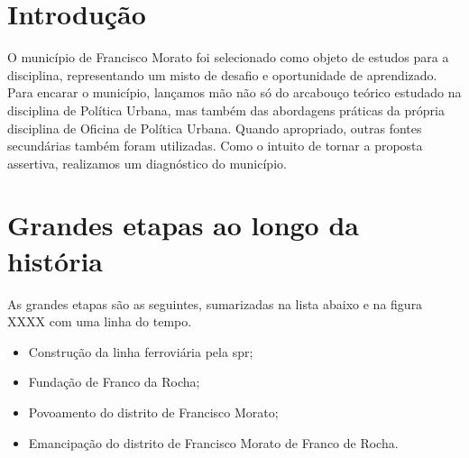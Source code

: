 	

	\tableofcontents 
	\newpage \listoffigures
	\newpage \listoftables
	\textual


%
%

%
%
	
	\chapter{Introdução}

	O município de Francisco Morato foi selecionado como objeto de estudos para a disciplina, representando um misto de desafio e oportunidade de aprendizado. Para encarar o município, lançamos mão não só do arcabouço teórico estudado na disciplina de Política Urbana, mas também das abordagens práticas da própria disciplina de Oficina de Política Urbana. Quando apropriado, outras fontes secundárias também foram utilizadas. Como o intuito de tornar a proposta assertiva, realizamos um diagnóstico do município.
	
	\chapter{Grandes etapas ao longo da história}
	
	As grandes etapas são as seguintes, sumarizadas na lista abaixo e na figura XXXX com uma linha do tempo.
	
	\begin{itemize}
		\item Construção da linha ferroviária pela \gls{spr};
		\item Fundação de Franco da Rocha;
		\item Povoamento do distrito de Francisco Morato;
		\item Emancipação do distrito de Francisco Morato de Franco de Rocha.
	\end{itemize}
	
